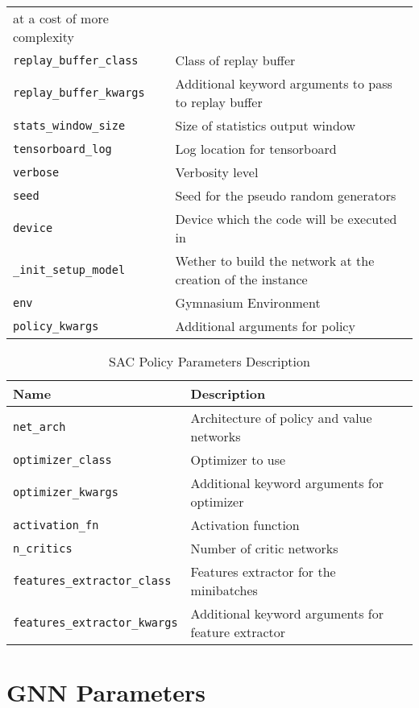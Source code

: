 \begin{table}[H]
\begin{tabularx}{\textwidth}{lX}
		at a cost of more complexity \\
		\texttt{replay\_buffer\_class} & Class of replay buffer \\
		\texttt{replay\_buffer\_kwargs} & Additional keyword arguments to pass to replay buffer \\
		\texttt{stats\_window\_size} & Size of statistics output window \\
		\texttt{tensorboard\_log} & Log location for tensorboard \\
		\texttt{verbose} & Verbosity level \\
		\texttt{seed} & Seed for the pseudo random generators \\
		\texttt{device} & Device which the code will be executed in \\
		\texttt{\_init\_setup\_model} & Wether to build the network at the creation of the instance \\
		\texttt{env} & Gymnasium Environment \\
		\texttt{policy\_kwargs} & Additional arguments for policy \\
		\bottomrule
	\end{tabularx}
	\label{tab:sac-params}
\end{table}

\begin{table}[H]
	\centering
	\caption{\ac{SAC} Policy Parameters Description}
	\begin{tabularx}{\textwidth}{lX}
		\toprule
		\textbf{Name} & \textbf{Description} \\
		\midrule
		\texttt{net\_arch} & Architecture of policy and value networks \\
		\texttt{optimizer\_class} & Optimizer to use \\
		\texttt{optimizer\_kwargs} & Additional keyword arguments for optimizer \\
		\texttt{activation\_fn} & Activation function \\
		\texttt{n\_critics} & Number of critic networks \\
		\texttt{features\_extractor\_class} & Features extractor for the minibatches  \\
		\texttt{features\_extractor\_kwargs} & Additional keyword arguments for feature extractor \\
		\bottomrule
	\end{tabularx}
	\label{tab:sac-pol-params}
\end{table}

\section{\ac{GNN} Parameters}

